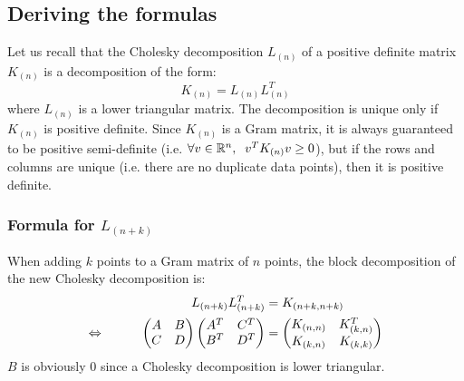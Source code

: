 \subsection{Deriving the formulas}
\label{ssec:formulas}

Let us recall that the Cholesky decomposition $L_{(n)}$ of a positive definite matrix $K_{(n)}$ is a decomposition of the form:
\begin{equation}
	K_{(n)} = L_{(n)} L_{(n)}^T
\end{equation}
where $L_{(n)}$ is a lower triangular matrix. The decomposition is unique only if $K_{(n)}$ is positive definite. Since $K_{(n)}$ is a Gram matrix, it is always guaranteed to be positive semi-definite (i.e. $\forall v \in \mathbb{R}^n, \mkern10mu v^T K_{(n)} v \geq 0$), but if the rows and columns are unique (i.e. there are no duplicate data points), then it is positive definite.

\subsubsection[Formula for the Cholesky decomposition]{Formula for $L_{(n+k)}$}

When adding $k$ points to a Gram matrix of $n$ points, the block decomposition of the new Cholesky decomposition is:
\begin{alignat*}{2}
	&&L_{(n+k)} L_{(n+k)}^T &= K_{(n+k,n+k)} \\
	\Leftrightarrow\mkern40mu
	&&\begin{pmatrix}
    A & B \\
    C & D
  \end{pmatrix}
  \begin{pmatrix}
    A^T & C^T \\
    B^T & D^T
  \end{pmatrix} &= 
  \begin{pmatrix}
    K_{(n,n)} & K_{(k,n)}^T \\
    K_{(k,n)} & K_{(k,k)}
  \end{pmatrix}
\end{alignat*}
$B$ is obviously $0$ since a Cholesky decomposition is lower triangular.

